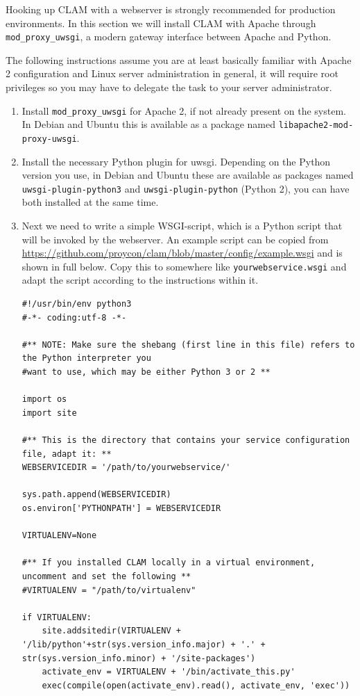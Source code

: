 \documentclass[a4paper,12pt,twoside,openright]{report}
\begin{document}
Hooking up CLAM with a webserver is strongly recommended for production
environments. In this section we will install CLAM with Apache through
\texttt{mod\_proxy\_uwsgi}, a modern gateway interface between Apache and
Python.  

The following instructions assume you are at least
basically familiar with Apache 2 configuration and Linux server administration
in general, it will require root privileges so you may have to delegate the
task to your server administrator.

\begin{enumerate}[leftmargin=5mm]
\item Install \texttt{mod\_proxy\_uwsgi} for Apache 2, if not already
present on the system. In Debian and Ubuntu this is available as a package
named \texttt{libapache2-mod-proxy-uwsgi}.
\item Install the necessary Python plugin for uwsgi. Depending on the Python
    version you use, in Debian and Ubuntu these are available as packages
    named \texttt{uwsgi-plugin-python3} and \texttt{uwsgi-plugin-python}
    (Python 2), you can have both installed at the same time.
\item Next we need to write a simple
WSGI-script, which is a Python script that will be invoked by the
webserver. An example script can be copied from
\url{https://github.com/proycon/clam/blob/master/config/example.wsgi} and
is shown in full below. Copy this to somewhere like
\texttt{yourwebservice.wsgi} and adapt the script according to the instructions
within it.

{ \small
\begin{verbatim}
#!/usr/bin/env python3
#-*- coding:utf-8 -*-

#** NOTE: Make sure the shebang (first line in this file) refers to the Python interpreter you
#want to use, which may be either Python 3 or 2 **

import os
import site

#** This is the directory that contains your service configuration file, adapt it: **
WEBSERVICEDIR = '/path/to/yourwebservice/'

sys.path.append(WEBSERVICEDIR)
os.environ['PYTHONPATH'] = WEBSERVICEDIR

VIRTUALENV=None

#** If you installed CLAM locally in a virtual environment, uncomment and set the following **
#VIRTUALENV = "/path/to/virtualenv"

if VIRTUALENV:
    site.addsitedir(VIRTUALENV + '/lib/python'+str(sys.version_info.major) + '.' + str(sys.version_info.minor) + '/site-packages')
    activate_env = VIRTUALENV + '/bin/activate_this.py'
    exec(compile(open(activate_env).read(), activate_env, 'exec'))


\end{verbatim}}
\end{enumerate}
\end{document}
